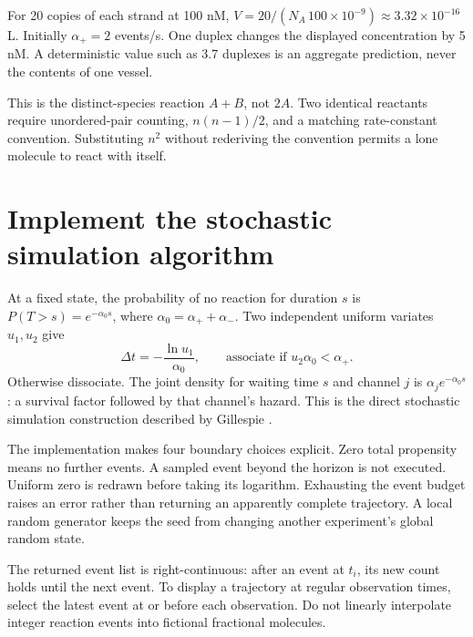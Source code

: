 
For 20 copies of each strand at 100 nM,
$V=20/(N_A\,100\times10^{-9})\approx3.32\times10^{-16}$ L.
Initially $\alpha_+=2$ events/s. One duplex changes the displayed
concentration by 5 nM. A deterministic value such as 3.7 duplexes is
an aggregate prediction, never the contents of one vessel.

This is the distinct-species reaction $A+B$, not $2A$. Two identical
reactants require unordered-pair counting, $n(n-1)/2$, and a matching
rate-constant convention. Substituting $n^2$ without rederiving the
convention permits a lone molecule to react with itself.


\section{Implement the stochastic simulation algorithm}

At a fixed state, the probability of no reaction for duration $s$ is
$P(T>s)=e^{-\alpha_0s}$, where $\alpha_0=\alpha_++\alpha_-$.
Two independent uniform variates $u_1,u_2$ give
\begin{equation}
 \Delta t=-\frac{\ln u_1}{\alpha_0},\qquad
 \text{associate if }u_2\alpha_0<\alpha_+.
\end{equation}
Otherwise dissociate. The joint density for waiting time $s$ and channel
$j$ is $\alpha_j e^{-\alpha_0s}$: a survival factor followed by that
channel's hazard. This is the direct stochastic simulation construction
described by Gillespie \cite{gillespie}.


The implementation makes four boundary choices explicit. Zero total
propensity means no further events. A sampled event beyond the horizon
is not executed. Uniform zero is redrawn before taking its logarithm.
Exhausting the event budget raises an error rather than returning an
apparently complete trajectory. A local random generator keeps the seed
from changing another experiment's global random state.

The returned event list is right-continuous: after an event at $t_i$,
its new count holds until the next event. To display a trajectory at
regular observation times, select the latest event at or before each
observation. Do not linearly interpolate integer reaction events into
fictional fractional molecules.

